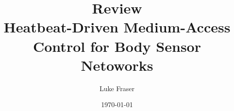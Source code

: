 \documentclass{article}
\begin{document}
\title{{\large Review} \\ Heatbeat-Driven Medium-Access Control  for Body Sensor Netoworks}
\author{Luke Fraser}
\date{\today}
\maketitle

\begingroup
\renewcommand{\section}[2]{}


\endgroup

\section*{Summary}

\section*{Strengths}

\section*{Critique}

\cite{5229313}
\end{document}
